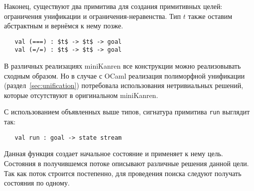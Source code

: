
Наконец, существуют два примитива для создания примитивных целей: ограничения унификации и ограничения-неравенства. Тип  $t$  также оставим абстрактным и вернёмся к нему позже.

\begin{lstlisting}
   val (===) : $t$ -> $t$ -> goal
   val (=/=) : $t$ -> $t$ -> goal
\end{lstlisting}


\noindent В различных реализациях miniKanren все конструкции можно реализовывать сходным образом.
Но в случае с OCaml реализация полиморфной унификации (раздел~\ref{sec:unification}) потребовала использования нетривиальных решений, которые отсутствуют в оригинальном miniKanren.


С использованием объявленных выше типов, сигнатура примитива \lstinline|run| выглядит так:

\begin{lstlisting}
   val run : goal -> state stream
\end{lstlisting}

\noindent Данная функция создает начальное состояние и применяет к нему цель. Состояния в получившемся потоке описывают различные решения данной цели.
Так как поток строится постепенно, для проведения поиска следуют получать состояния по одному.

